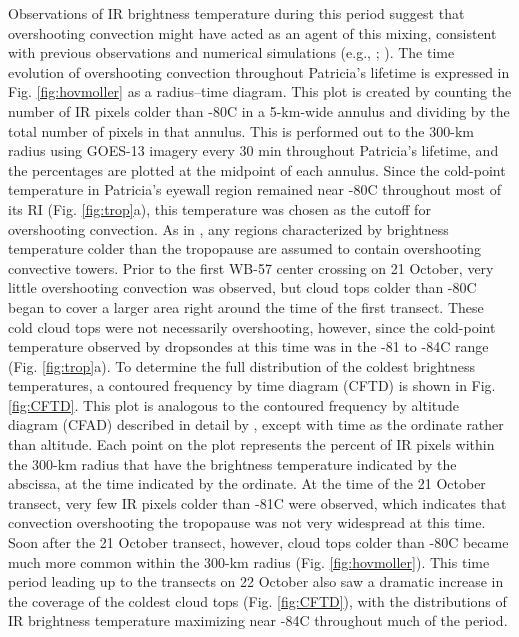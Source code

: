 Observations of IR brightness temperature during this period suggest that overshooting convection might have acted as an agent of this mixing, consistent with previous observations and numerical simulations (e.g.,\citeauthor{Danielsen1993} \citeyear{Danielsen1993}; \citeauthor{Salbyetal2003} \citeyear{Salbyetal2003}).
The time evolution of overshooting convection throughout Patricia’s lifetime is expressed in Fig. \ref{fig:hovmoller}  as a radius--time diagram.
This plot is created by counting the number of IR pixels colder than -80\textdegree{}C in a 5-km-wide annulus and dividing by the total number of pixels in that annulus.
This is performed out to the 300-km radius using GOES-13 imagery every 30 min throughout Patricia’s lifetime, and the percentages are plotted at the midpoint of each annulus.
Since the cold-point temperature in Patricia’s eyewall region remained near -80\textdegree{}C throughout most of its RI (Fig. \ref{fig:trop}a), this temperature was chosen as the cutoff for overshooting convection.
As in \cite{EbertHolland1992}, any regions characterized by brightness temperature colder than the tropopause are assumed to contain overshooting convective towers.
Prior to the first WB-57 center crossing on 21 October, very little overshooting convection was observed, but cloud tops colder than -80\textdegree{}C began to cover a larger area right around the time of the first transect.
These cold cloud tops were not necessarily overshooting, however, since the cold-point temperature observed by dropsondes at this time was in the -81\textdegree{} to -84\textdegree{}C range (Fig. \ref{fig:trop}a).
To determine the full distribution of the coldest brightness temperatures, a contoured frequency by time diagram (CFTD) is shown in Fig. \ref{fig:CFTD}.
This plot is analogous to the contoured frequency by altitude diagram (CFAD) described in detail by \cite{YuterHouze1995}, except with time as the ordinate rather than altitude.
Each point on the plot represents the percent of IR pixels within the 300-km radius that have the brightness temperature indicated by the abscissa, at the time indicated by the ordinate.
At the time of the 21 October transect, very few IR pixels colder than -81\textdegree{}C were observed, which indicates that convection overshooting the tropopause was not very widespread at this time.
Soon after the 21 October transect, however, cloud tops colder than -80\textdegree{}C became much more common within the 300-km radius (Fig. \ref{fig:hovmoller}).
This time period leading up to the transects on 22 October also saw a dramatic increase in the coverage of the coldest cloud tops (Fig. \ref{fig:CFTD}), with the distributions of IR brightness temperature maximizing near -84\textdegree{}C throughout much of the period.
